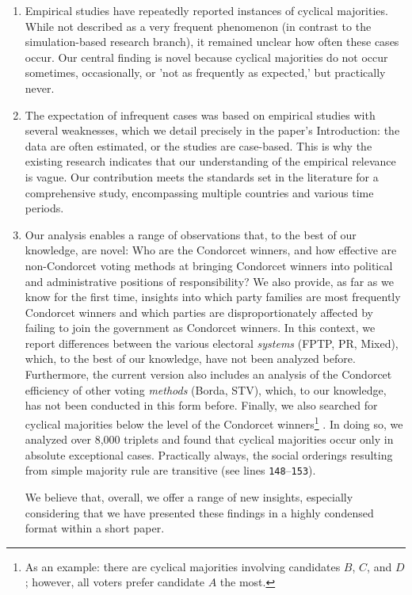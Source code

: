 \documentclass[a4paper, 12pt]{scrartcl}
\begin{document}
\begin{enumerate}
	\item Empirical studies have repeatedly reported instances of cyclical majorities. While not described as a very frequent phenomenon (in contrast to the simulation-based research branch), it remained unclear how often these cases occur. Our central finding is novel because cyclical majorities do not occur sometimes, occasionally, or 'not as frequently as expected,' but practically never.
	\item The expectation of infrequent cases was based on empirical studies with several weaknesses, which we detail precisely in the paper's Introduction: the data are often estimated, or the studies are case-based. This is why the existing research indicates that our understanding of the empirical relevance is vague. Our contribution meets the standards set in the literature for a comprehensive study, encompassing multiple countries and various time periods.
	\item Our analysis enables a range of observations that, to the best of our knowledge, are novel: Who are the Condorcet winners, and how effective are non-Condorcet voting methods at bringing Condorcet winners into political and administrative positions of responsibility? We also provide, as far as we know for the first time, insights into which party families are most frequently Condorcet winners and which parties are disproportionately affected by failing to join the government as Condorcet winners. In this context, we report differences between the various electoral \emph{systems} (FPTP, PR, Mixed), which, to the best of our knowledge, have not been analyzed before. Furthermore, the current version also includes an analysis of the Condorcet efficiency of other voting \emph{methods} (Borda, STV), which, to our knowledge, has not been conducted in this form before. Finally, we also searched for cyclical majorities below the level of the Condorcet winners\footnote{
	As an example: there are cyclical majorities involving candidates $B$, $C$, and $D$; however, all voters prefer candidate $A$ the most.
} . In doing so, we analyzed over 8,000 triplets and found that cyclical majorities occur only in absolute exceptional cases. Practically always, the social orderings resulting from simple majority rule are transitive (see lines \texttt{148$–$153}).

We believe that, overall, we offer a range of new insights, especially considering that we have presented these findings in a highly condensed format within a short paper.
\end{enumerate}
\end{document}
